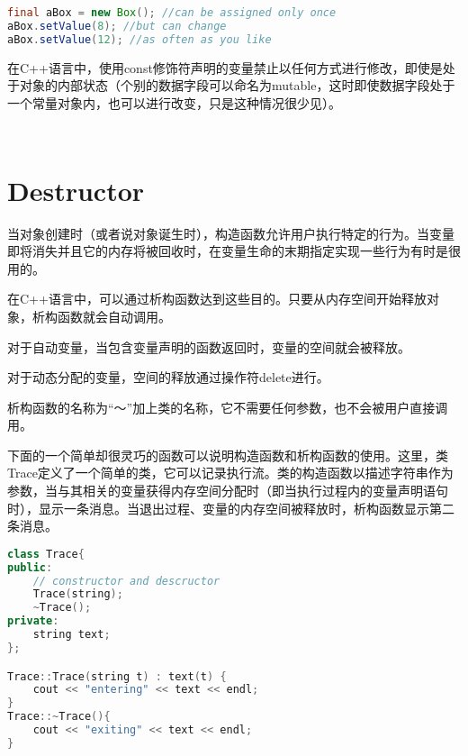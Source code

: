 \begin{lstlisting}[language=Java]
final aBox = new Box(); //can be assigned only once
aBox.setValue(8); //but can change
aBox.setValue(12); //as often as you like
\end{lstlisting}

在C++语言中，使用const修饰符声明的变量禁止以任何方式进行修改，即使是处于对象的内部状态（个别的数据字段可以命名为mutable，这时即使数据字段处于一个常量对象内，也可以进行改变，只是这种情况很少见）。


\begin{lstlisting}[language=C++]

\end{lstlisting}




\begin{lstlisting}[language=C++]

\end{lstlisting}


\chapter{Destructor}



当对象创建时（或者说对象诞生时），构造函数允许用户执行特定的行为。当变量即将消失并且它的内存将被回收时，在变量生命的末期指定实现一些行为有时是很用的。

在C++语言中，可以通过析构函数达到这些目的。只要从内存空间开始释放对象，析构函数就会自动调用。

\begin{compactitem}
\item 对于自动变量，当包含变量声明的函数返回时，变量的空间就会被释放。
\item 对于动态分配的变量，空间的释放通过操作符delete进行。
\end{compactitem}

析构函数的名称为“～”加上类的名称，它不需要任何参数，也不会被用户直接调用。

下面的一个简单却很灵巧的函数可以说明构造函数和析构函数的使用。这里，类Trace定义了一个简单的类，它可以记录执行流。类的构造函数以描述字符串作为参数，当与其相关的变量获得内存空间分配时（即当执行过程内的变量声明语句时），显示一条消息。当退出过程、变量的内存空间被释放时，析构函数显示第二条消息。


\begin{lstlisting}[language=C++]
class Trace{
public:
	// constructor and descructor
	Trace(string);
	~Trace();
private:
	string text;
};

Trace::Trace(string t) : text(t) {
	cout << "entering" << text << endl;
}
Trace::~Trace(){
	cout << "exiting" << text << endl;
}
\end{lstlisting}


